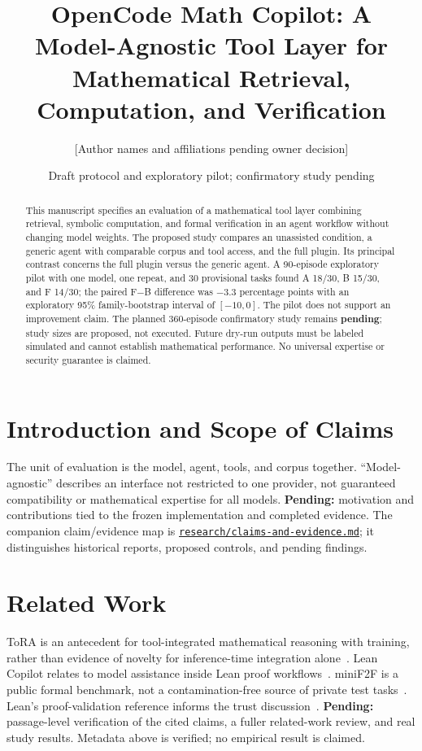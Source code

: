 \documentclass{article}
\title{OpenCode Math Copilot: A Model-Agnostic Tool Layer for Mathematical Retrieval, Computation, and Verification}
\author{[Author names and affiliations pending owner decision]}
\date{Draft protocol and exploratory pilot; confirmatory study pending}
\begin{document}
\maketitle

\begin{abstract}
This manuscript specifies an evaluation of a mathematical tool layer
combining retrieval, symbolic computation, and formal verification in an agent
workflow without changing model weights. The proposed study compares an
unassisted condition, a generic agent with comparable corpus and tool access,
and the full plugin. Its principal contrast concerns the full plugin versus
the generic agent. A 90-episode exploratory pilot with one model, one repeat,
and 30 provisional tasks found A 18/30, B 15/30, and F 14/30; the paired
F$-$B difference was $-3.3$ percentage points with an exploratory 95\%
family-bootstrap interval of $[-10,0]$. The pilot does not support an
improvement claim. The planned 360-episode confirmatory study remains
\textbf{pending}; study sizes are proposed, not executed. Future dry-run
outputs must be labeled simulated and cannot establish mathematical
performance. No universal expertise or security guarantee is claimed.
\end{abstract}

\section{Introduction and Scope of Claims}
The unit of evaluation is the model, agent, tools, and corpus together.
``Model-agnostic'' describes an interface not restricted to one provider,
not guaranteed compatibility or mathematical expertise for all models.
\textbf{Pending:} motivation and contributions tied to the frozen implementation
and completed evidence. The companion claim/evidence map is
\href{../research/claims-and-evidence.md}{\texttt{research/claims-and-evidence.md}};
it distinguishes historical reports, proposed controls, and pending findings.

\section{Related Work}
ToRA is an antecedent for tool-integrated mathematical reasoning with
training, rather than evidence of novelty for inference-time integration
alone~\cite{tora2023}. Lean Copilot relates to model assistance inside Lean
proof workflows~\cite{leanCopilot2024}. miniF2F is a public formal benchmark,
not a contamination-free source of private test tasks~\cite{minif2f2021}.
Lean's proof-validation reference informs the trust discussion~\cite{leanProofValidation}.
\textbf{Pending:} passage-level verification of the cited claims, a fuller
related-work review, and real study results. Metadata above is verified; no
empirical result is claimed.
\end{document}
